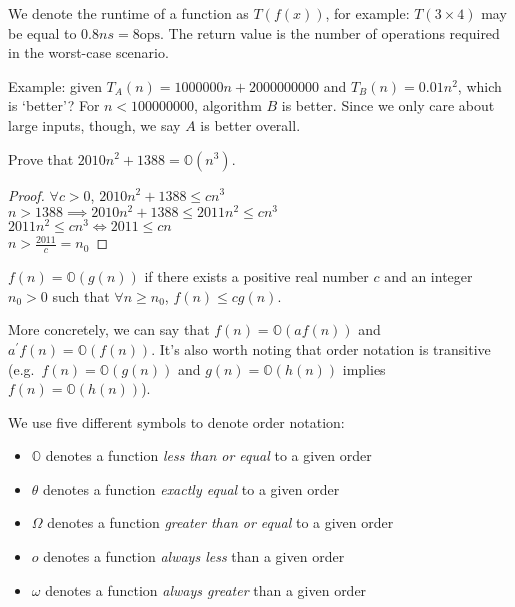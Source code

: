 \documentclass[12pt]{article}
\begin{document}
We denote the runtime of a function as $T(f(x))$, for example: $T(3 \times 4)$ may be equal to $0.8ns = 8\text{ops}$. The return value is the number of operations required in the worst-case scenario.

Example: given $T_A(n) = 1 000 000n + 2 000 000 000$ and $T_B(n) = 0.01n^2$, which is `better'? For $n < 100 000 000$, algorithm $B$ is better. Since we only care about large inputs, though, we say $A$ is better overall.

\begin{example}
Prove that $2010n^2 + 1388 = \mathbb{O}(n^3)$.
\end{example}

\begin{proof}
$\forall c > 0$, $2010 n^2 + 1388 \leq cn^3$\\
$n > 1388 \implies 2010n^2 + 1388 \leq 2011n^2 \leq cn^3$\\
$2011n^2 \leq cn^3 \iff 2011 \leq cn$\\
$n > \frac{2011}{c} = n_0$
\end{proof}

\begin{definition}
$f(n) = \mathbb{O}(g(n))$ if there exists a positive real number $c$ and an integer $n_0 > 0$ such that $\forall n \geq n_0$, $f(n) \leq cg(n)$.
\end{definition}

More concretely, we can say that $f(n) = \mathbb{O}(af(n))$ and $a^\prime f(n) = \mathbb{O}(f(n))$. It's also worth noting that order notation is transitive (e.g.\ $f(n) = \mathbb{O}(g(n))$ and $g(n) = \mathbb{O}(h(n))$ implies $f(n) = \mathbb{O}(h(n))$).

We use five different symbols to denote order notation:
\begin{itemize}
\item $\mathbb{O}$ denotes a function \emph{less than or equal} to a given order
\item $\theta$ denotes a function \emph{exactly equal} to a given order
\item $\Omega$ denotes a function \emph{greater than or equal} to a given order
\item $o$ denotes a function \emph{always less} than a given order
\item $\omega$ denotes a function \emph{always greater} than a given order
\end{itemize}
\end{document}
